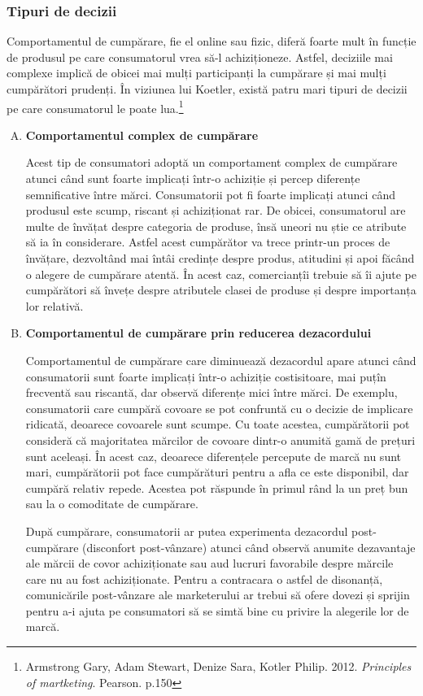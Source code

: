 \documentclass[a4paper, 12pt]{article}
\begin{document}
			\subsubsection{Tipuri de decizii}
				\qquad Comportamentul de cumpărare, fie el online sau fizic, diferă foarte mult în funcție de produsul pe care consumatorul vrea să-l achiziționeze. Astfel, deciziile mai complexe implică de obicei mai mulți participanți la cumpărare și mai mulți cumpărători prudenți. În viziunea lui Koetler, există patru mari tipuri de decizii pe care consumatorul le poate lua.\footnote{Armstrong Gary, Adam Stewart, Denize Sara, Kotler Philip. 2012. \textit{Principles of martketing}. Pearson. p.150}
			\begin{enumerate}[A)]
				\item \textbf{Comportamentul complex de cumpărare}
				
				\quad Acest tip de consumatori adoptă un comportament complex de cumpărare atunci când sunt foarte implicați într-o achiziție și percep diferențe semnificative între mărci. Consumatorii pot fi foarte implicați atunci când produsul este scump, riscant și achiziționat rar. De obicei, consumatorul are multe de învățat despre categoria de produse, însă uneori nu știe ce atribute să ia în considerare. Astfel acest cumpărător va trece printr-un proces de învățare, dezvoltând mai întâi credințe despre produs, atitudini și apoi făcând o alegere de cumpărare atentă. În acest caz, comercianțîi trebuie să îi ajute pe cumpărători să învețe despre atributele clasei de produse și despre importanța lor relativă.
				
				\item \textbf{Comportamentul de cumpărare prin reducerea dezacordului}
				
				\quad Comportamentul de cumpărare care diminuează dezacordul apare atunci când consumatorii sunt foarte implicați într-o achiziție costisitoare, mai puțîn frecventă sau riscantă, dar observă diferențe mici între mărci. De exemplu, consumatorii care cumpără covoare se pot confruntă cu o decizie de implicare ridicată, deoarece covoarele sunt scumpe. Cu toate acestea, cumpărătorii pot consideră că majoritatea mărcilor de covoare dintr-o anumită gamă de prețuri sunt aceleași. În acest caz, deoarece diferențele percepute de marcă nu sunt mari, cumpărătorii pot face cumpărături pentru a afla ce este disponibil, dar cumpără relativ repede. Acestea pot răspunde în primul rând la un preț bun sau la o comoditate de cumpărare.
				
				\quad După cumpărare, consumatorii ar putea experimenta dezacordul post-cumpărare (disconfort post-vânzare) atunci când observă anumite dezavantaje ale mărcii de covor achiziționate sau aud lucruri favorabile despre mărcile care nu au fost achiziționate. Pentru a contracara o astfel de disonanță, comunicările post-vânzare ale marketerului ar trebui să ofere dovezi și sprijin pentru a-i ajuta pe consumatori să se simtă bine cu privire la alegerile lor de marcă.
				

\end{enumerate}
\end{document}
